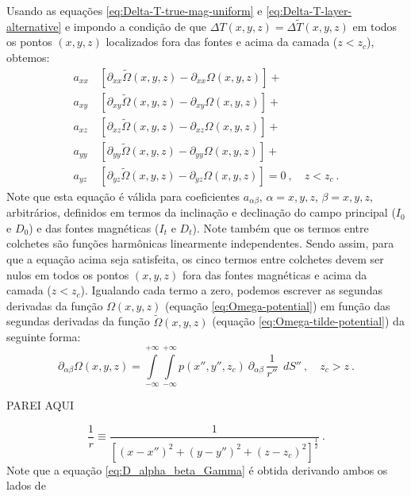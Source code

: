 Usando as equações \ref{eq:Delta-T-true-mag-uniform} e \ref{eq:Delta-T-layer-alternative} e 
impondo a condição de que $\Delta T(x, y, z) = \Delta \tilde{T}(x, y, z)$ em todos os pontos 
$(x, y, z)$ localizados fora das fontes e acima da camada ($z < z_{c}$), obtemos:
\begin{equation}
\begin{split}
a_{xx} \, &\left[\partial_{xx} \tilde{\Omega}(x, y, z) - \partial_{xx} \Omega(x, y, z) \right] + \\
a_{xy} \, &\left[\partial_{xy} \tilde{\Omega}(x, y, z) - \partial_{xy} \Omega(x, y, z) \right] + \\
a_{xz} \, &\left[\partial_{xz} \tilde{\Omega}(x, y, z) - \partial_{xz} \Omega(x, y, z) \right] + \\
a_{yy} \, &\left[\partial_{yy} \tilde{\Omega}(x, y, z) - \partial_{yy} \Omega(x, y, z) \right] + \\
a_{yz} \, &\left[\partial_{yz} \tilde{\Omega}(x, y, z) - \partial_{yz} \Omega(x, y, z) \right] = 0
\: , \quad z < z_{c} \: .
\end{split}
\label{eq:tfanomaly-alternative-equality}
\end{equation}
Note que esta equação é válida para coeficientes $a_{\alpha\beta}$, $\alpha = x, y, z$, $\beta = x, y, z$, 
arbitrários, definidos em termos da inclinação e declinação do campo principal ($I_{0}$ e $D_{0}$) 
e das fontes magnéticas ($I_{t}$ e $D_{t}$). 
Note também que os termos entre colchetes são funções harmônicas linearmente 
independentes. Sendo assim, para que a equação acima seja satisfeita, os cinco termos entre colchetes 
devem ser nulos em todos os pontos $(x,y,z)$ fora das fontes magnéticas e acima da camada ($z < z_{c}$). 
Igualando cada termo a zero, podemos escrever as segundas derivadas da função $\Omega(x, y, z)$
(equação \ref{eq:Omega-potential}) em função das segundas derivadas da função 
$\tilde{\Omega}(x, y, z)$ (equação \ref{eq:Omega-tilde-potential}) da seguinte forma:
\begin{equation}
	\partial_{\alpha\beta} \Omega(x, y, z) = 
	\int\limits_{-\infty}^{+\infty}\int\limits_{-\infty}^{+\infty}
	p(x'', y'', z_{c}) \: \partial_{\alpha\beta} \, \frac{1}{r''} \:\: dS'' \: ,
	\quad z_{c} > z \: .
	\label{eq:D_alpha_beta_Gamma}
\end{equation}

PAREI AQUI

\begin{equation}
   \frac{1}{r} \equiv 
	\frac{1}{\left[ (x-x'')^2 + (y-y'')^2 + (z-z_{c})^2 \right]^{\frac{1}{2}}} \: .
	\label{eq:inverse-distance}
\end{equation}
Note que a equação \ref{eq:D_alpha_beta_Gamma} é obtida derivando ambos os lados de 

